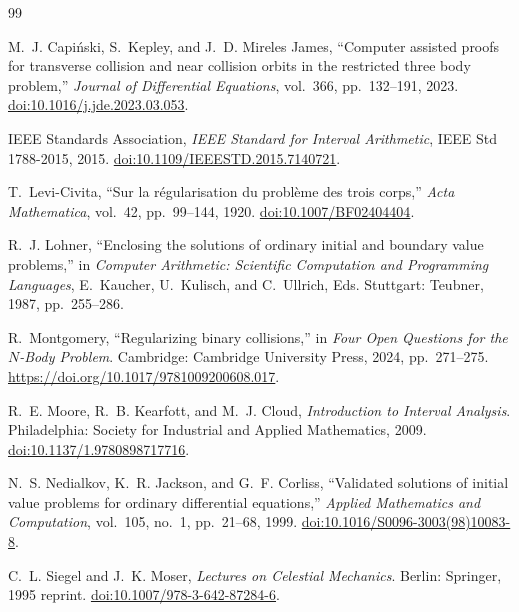 \documentclass[11pt]{article}
\begin{document}
\begin{thebibliography}{99}

M.~J. Capi\'nski, S.~Kepley, and J.~D. Mireles James,
``Computer assisted proofs for transverse collision and near collision orbits
in the restricted three body problem,''
\emph{Journal of Differential Equations}, vol.~366, pp.~132--191, 2023.
\href{https://doi.org/10.1016/j.jde.2023.03.053}{doi:10.1016/j.jde.2023.03.053}.

IEEE Standards Association,
\emph{IEEE Standard for Interval Arithmetic}, IEEE Std 1788-2015, 2015.
\href{https://doi.org/10.1109/IEEESTD.2015.7140721}{doi:10.1109/IEEESTD.2015.7140721}.

T.~Levi-Civita,
``Sur la r\'egularisation du probl\`eme des trois corps,''
\emph{Acta Mathematica}, vol.~42, pp.~99--144, 1920.
\href{https://doi.org/10.1007/BF02404404}{doi:10.1007/BF02404404}.

R.~J. Lohner,
``Enclosing the solutions of ordinary initial and boundary value problems,''
in \emph{Computer Arithmetic: Scientific Computation and Programming
Languages}, E.~Kaucher, U.~Kulisch, and C.~Ullrich, Eds. Stuttgart: Teubner,
1987, pp.~255--286.

R.~Montgomery,
``Regularizing binary collisions,'' in \emph{Four Open Questions for the
$N$-Body Problem}. Cambridge: Cambridge University Press, 2024,
pp.~271--275.
\url{https://doi.org/10.1017/9781009200608.017}.

R.~E. Moore, R.~B. Kearfott, and M.~J. Cloud,
\emph{Introduction to Interval Analysis}. Philadelphia: Society for
Industrial and Applied Mathematics, 2009.
\href{https://doi.org/10.1137/1.9780898717716}{doi:10.1137/1.9780898717716}.

N.~S. Nedialkov, K.~R. Jackson, and G.~F. Corliss,
``Validated solutions of initial value problems for ordinary differential
equations,'' \emph{Applied Mathematics and Computation}, vol.~105, no.~1,
pp.~21--68, 1999.
\href{https://doi.org/10.1016/S0096-3003(98)10083-8}{doi:10.1016/S0096-3003(98)10083-8}.

C.~L. Siegel and J.~K. Moser,
\emph{Lectures on Celestial Mechanics}. Berlin: Springer, 1995 reprint.
\href{https://doi.org/10.1007/978-3-642-87284-6}{doi:10.1007/978-3-642-87284-6}.

\end{thebibliography}
\end{document}
